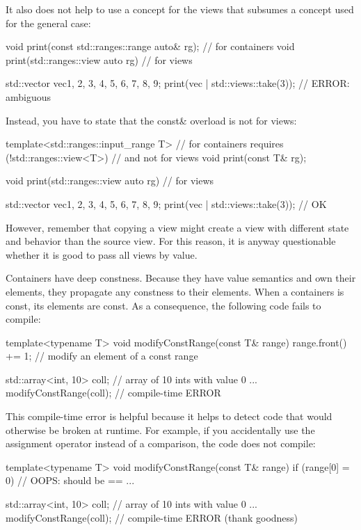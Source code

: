 It also does not help to use a concept for the views that subsumes a concept used for the general case:

\begin{cpp}
void print(const std::ranges::range auto& rg); // for containers
void print(std::ranges::view auto rg) // for views

std::vector vec{1, 2, 3, 4, 5, 6, 7, 8, 9};
print(vec | std::views::take(3)); // ERROR: ambiguous
\end{cpp}

Instead, you have to state that the const\& overload is not for views:

\begin{cpp}
template<std::ranges::input_range T> // for containers
requires (!std::ranges::view<T>) // and not for views
void print(const T& rg);

void print(std::ranges::view auto rg) // for views

std::vector vec{1, 2, 3, 4, 5, 6, 7, 8, 9};
print(vec | std::views::take(3)); // OK
\end{cpp}

However, remember that copying a view might create a view with different state and behavior than the source view. For this reason, it is anyway questionable whether it is good to pass all views by value.


Containers have deep constness. Because they have value semantics and own their elements, they propagate any constness to their elements. When a containers is const, its elements are const. As a consequence, the following code fails to compile:

\begin{cpp}
template<typename T>
void modifyConstRange(const T& range)
{
	range.front() += 1; // modify an element of a const range
}

std::array<int, 10> coll{}; // array of 10 ints with value 0
...
modifyConstRange(coll); // compile-time ERROR
\end{cpp}

This compile-time error is helpful because it helps to detect code that would otherwise be broken at runtime. For example, if you accidentally use the assignment operator instead of a comparison, the code does not compile:

\begin{cpp}
template<typename T>
void modifyConstRange(const T& range)
{
	if (range[0] = 0) { // OOPS: should be ==
		...
	}
}

std::array<int, 10> coll{}; // array of 10 ints with value 0
...
modifyConstRange(coll); // compile-time ERROR (thank goodness)
\end{cpp}

